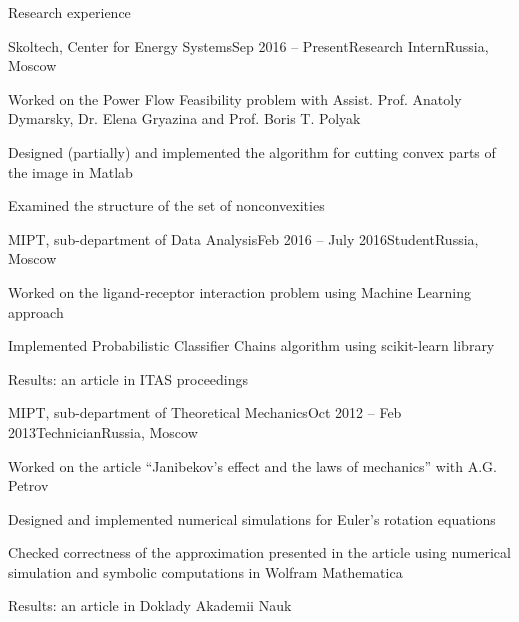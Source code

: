 \documentclass{resume} %
\begin{document}
\begin{rSection}{Research experience}
	\begin{rSubsection}{Skoltech, Center for Energy Systems}{Sep 2016 -- Present}{Research Intern}{Russia, Moscow}
		\item Worked on the Power Flow Feasibility problem with Assist. Prof. Anatoly Dymarsky, Dr. Elena Gryazina and Prof. Boris T. Polyak
		\item Designed (partially) and implemented the algorithm for cutting convex parts of the image in Matlab
		\item Examined the structure of the set of nonconvexities
	\end{rSubsection}
	
	\begin{rSubsection}{MIPT, sub-department of Data Analysis}{Feb 2016 -- July 2016}{Student}{Russia, Moscow}
		\item Worked on the ligand-receptor interaction problem using Machine Learning approach
		\item Implemented Probabilistic Classifier Chains algorithm using scikit-learn library
		\item Results: an article in ITAS proceedings
	\end{rSubsection}
	
	\begin{rSubsection}{MIPT, sub-department of Theoretical Mechanics}{Oct 2012 -- Feb 2013}{Technician}{Russia, Moscow}
		\item Worked on the article ``Janibekov's effect and the laws of mechanics'' with A.G. Petrov
		\item Designed and implemented numerical simulations for Euler's rotation equations
		\item Checked correctness of the approximation presented in the article using numerical simulation and symbolic computations in Wolfram Mathematica
		\item Results: an article in Doklady Akademii Nauk
	\end{rSubsection}
\end{rSection}

\end{document}
